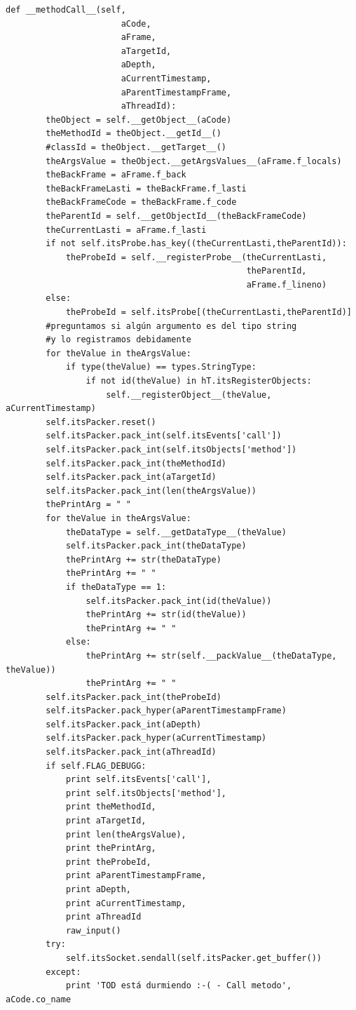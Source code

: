 \documentclass[12pt,legalpaper]{report}
\begin{document}
\begin{singlespace}
\begin{lstlisting}[style=Python]
    def __methodCall__(self,
                       aCode,
                       aFrame, 
                       aTargetId,
                       aDepth,
                       aCurrentTimestamp,
                       aParentTimestampFrame,
                       aThreadId):
        theObject = self.__getObject__(aCode)
        theMethodId = theObject.__getId__()
        #classId = theObject.__getTarget__()
        theArgsValue = theObject.__getArgsValues__(aFrame.f_locals)
        theBackFrame = aFrame.f_back
        theBackFrameLasti = theBackFrame.f_lasti
        theBackFrameCode = theBackFrame.f_code
        theParentId = self.__getObjectId__(theBackFrameCode)
        theCurrentLasti = aFrame.f_lasti        
        if not self.itsProbe.has_key((theCurrentLasti,theParentId)):
            theProbeId = self.__registerProbe__(theCurrentLasti,
                                                theParentId,
                                                aFrame.f_lineno)
        else:
            theProbeId = self.itsProbe[(theCurrentLasti,theParentId)]
        #preguntamos si algún argumento es del tipo string
        #y lo registramos debidamente
        for theValue in theArgsValue:
            if type(theValue) == types.StringType:
                if not id(theValue) in hT.itsRegisterObjects:
                    self.__registerObject__(theValue, aCurrentTimestamp)            
        self.itsPacker.reset()
        self.itsPacker.pack_int(self.itsEvents['call'])
        self.itsPacker.pack_int(self.itsObjects['method'])
        self.itsPacker.pack_int(theMethodId)
        self.itsPacker.pack_int(aTargetId)
        self.itsPacker.pack_int(len(theArgsValue))
        thePrintArg = " "
        for theValue in theArgsValue:
            theDataType = self.__getDataType__(theValue)
            self.itsPacker.pack_int(theDataType)
            thePrintArg += str(theDataType)
            thePrintArg += " "
            if theDataType == 1:
                self.itsPacker.pack_int(id(theValue))
                thePrintArg += str(id(theValue))
                thePrintArg += " "
            else:
                thePrintArg += str(self.__packValue__(theDataType, theValue))
                thePrintArg += " "
        self.itsPacker.pack_int(theProbeId)
        self.itsPacker.pack_hyper(aParentTimestampFrame)
        self.itsPacker.pack_int(aDepth)    
        self.itsPacker.pack_hyper(aCurrentTimestamp)
        self.itsPacker.pack_int(aThreadId)
        if self.FLAG_DEBUGG:
            print self.itsEvents['call'],
            print self.itsObjects['method'],
            print theMethodId,
            print aTargetId,
            print len(theArgsValue),
            print thePrintArg,
            print theProbeId,
            print aParentTimestampFrame,
            print aDepth,
            print aCurrentTimestamp,
            print aThreadId
            raw_input()
        try:
            self.itsSocket.sendall(self.itsPacker.get_buffer())
        except:
            print 'TOD está durmiendo :-( - Call metodo', aCode.co_name
    

\end{lstlisting}
\end{singlespace}
\end{document}
